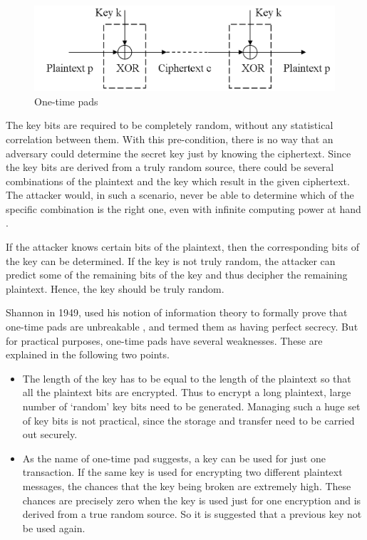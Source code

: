 \begin{figure}[ht!]
	\centering
		\includegraphics[width=4.4in]{./figures/one-time-pad.PNG}
	\caption{One-time pads}	
	\label{fig:one-time-pad}
\end{figure}

The key bits are required to be completely random, without any statistical correlation between them. With this pre-condition, there is no way that an adversary could determine the secret key just by knowing the ciphertext. Since the key bits are derived from a truly random source, there could be several combinations of the plaintext and the key which result in the given ciphertext. The attacker would, in such a scenario, never be able to determine which of the specific combination is the right one, even with infinite computing power at hand \cite{one-time-pads-link}.

If the attacker knows certain bits of the plaintext, then the corresponding bits of the key can be determined. If the key is not truly random, the attacker can predict some of the remaining bits of the key and thus decipher the remaining plaintext. Hence, the key should be truly random. 

Shannon in 1949, used his notion of information theory to formally prove that one-time pads are unbreakable \cite{shannon1949cts}, and termed them as having perfect secrecy. But for practical purposes, one-time pads have several weaknesses. These are explained in the following two points.
\begin{itemize}
\item The length of the key has to be equal to the length of the plaintext so that all the plaintext bits are encrypted. Thus to encrypt a long plaintext, large number of `random' key bits need to be generated. Managing such a huge set of key bits is not practical, since the storage and transfer need to be carried out securely. 

\item As the name of one-time pad suggests, a key can be used for just one transaction. If the same key is used for encrypting two different plaintext messages, the chances that the key being broken are extremely high. These chances are precisely zero when the key is used just for one encryption and is derived from a true random source. So it is suggested that a previous key not be used again.
\end{itemize}

